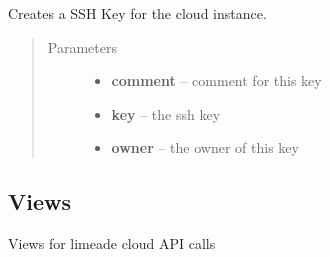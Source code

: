 \documentclass[letterpaper,10pt,english]{sphinxmanual}
\begin{document}

\begin{fulllineitems}
\label{api/cloud:limeade.cloud.models.SSHKey}
Creates a SSH Key for the cloud instance.
\begin{quote}\begin{description}
\item[{Parameters}] \leavevmode\begin{itemize}
\item {} 
\textbf{comment} -- comment for this key

\item {} 
\textbf{key} -- the ssh key

\item {} 
\textbf{owner} -- the owner of this key

\end{itemize}

\end{description}\end{quote}

\end{fulllineitems}



\subsection{Views}
\label{api/cloud:views}\label{api/cloud:module-limeade.cloud.views.api}
Views for limeade cloud API calls
\end{document}
